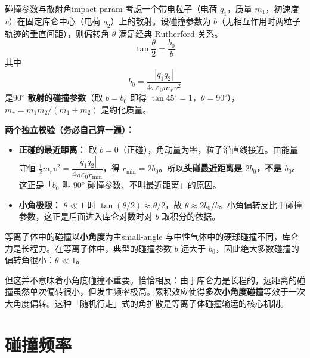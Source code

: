 \documentclass[12pt,a4paper,openany,oneside]{book}
\newcommand{\diffmarktext}[1]{%
  \textcolor{coverMid!80}{\rule[-0.1em]{2pt}{0.9em}}\,%
  \textcolor{coverMid}{\footnotesize\textbf{[#1]}}%
}
\newcommand{\difficulty}[1]{\marginnote{\raggedright\diffmarktext{#1}}}
\newcommand{\eps}{\varepsilon}
\begin{document}
\begin{definition}{碰撞参数与散射角}{impact-param}
考虑一个带电粒子（电荷 $q_1$，质量 $m_1$，初速度 $v$）在固定库仑中心（电荷 $q_2$）上的散射。设碰撞参数为 $b$（无相互作用时两粒子轨迹的垂直间距），则偏转角 $\theta$ 满足经典 Rutherford 关系。
\[
\tan\frac{\theta}{2} = \frac{b_0}{b}
\]
其中
\[
b_0 = \frac{|q_1 q_2|}{4\pi\eps_0 m_r v^2}
\]
是\textbf{$90^\circ$ 散射的碰撞参数}（取 $b=b_0$ 即得 $\tan45^\circ=1$，$\theta=90^\circ$），$m_r = m_1 m_2/(m_1+m_2)$ 是约化质量。

\textbf{两个独立校验（务必自己算一遍）：}
\begin{itemize}
\item \textbf{正碰的最近距离：} 取 $b=0$（正碰），角动量为零，粒子沿直线接近。由能量守恒 $\frac12 m_rv^2 = \dfrac{|q_1q_2|}{4\pi\eps_0 r_{\min}}$，得 $r_{\min} = 2b_0$。所以\textbf{头碰最近距离是 $2b_0$，不是 $b_0$}。这正是「$b_0$ 叫 90° 碰撞参数、不叫最近距离」的原因。
\item \textbf{小角极限：} $\theta\ll1$ 时 $\tan(\theta/2)\approx\theta/2$，故 $\theta\approx2b_0/b$。小角偏转反比于碰撞参数，这正是后面进入库仑对数时对 $b$ 取积分的依据。
\end{itemize}
\end{definition}

\begin{insight}{等离子体中的碰撞以\textbf{小角度}为主}{small-angle}
与中性气体中的硬球碰撞不同，库仑力是长程力。在等离子体中，典型的碰撞参数 $b$ 远大于 $b_0$，因此绝大多数碰撞的偏转角很小：$\theta \ll 1$。

但这并不意味着小角度碰撞不重要。恰恰相反：由于库仑力是长程的，远距离的碰撞虽然单次偏转很小，但发生频率极高。累积效应使得\textbf{多次小角度碰撞}等效于一次大角度偏转。这种「随机行走」式的角扩散是等离子体碰撞输运的核心机制。
\end{insight}

\section{碰撞频率}\difficulty{提高}
\label{sec:ch8-collision-freq}
\end{document}
